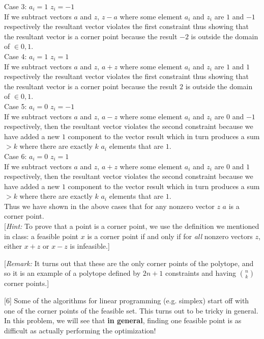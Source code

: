 \documentclass[addpoints, 11pt]{exam}
\begin{document}
\begin{questions}
  Case 3: $a_i = 1$ $z_i = -1$ \\
  If we subtract vectors $a$ and $z$, $z - a$ where some element $a_i$ and $z_i$ are $1$ and $-1$ respectively the resultant vector violates the first constraint
  thus showing that the resultant vector is a corner point because the result $-2$ is outside the domain of $\in 0, 1$. \\

  Case 4: $a_i = 1$ $z_i = 1$ \\
  If we subtract vectors $a$ and $z$, $a + z$ where some element $a_i$ and $z_i$ are $1$ and $1$ respectively the resultant vector violates the first constraint
  thus showing that the resultant vector is a corner point because the result $2$ is outside the domain of $\in 0, 1$. \\

  Case 5: $a_i = 0$ $z_i = -1$\\
  If we subtract vectors $a$ and $z$, $a - z$ where some element $a_i$ and $z_i$ are $0$ and $ -1$ respectively, then the resultant vector violates the second constraint because
  we have added a new $1$ component to the vector result which in turn produces a sum $> k$ where there are exactly $k$ $a_i$ elements that are $1$.\\

  Case 6: $a_i = 0$ $z_i = 1$ \\
  If we subtract vectors $a$ and $z$, $a + z$ where some element $a_i$ and $z_i$ are $0$ and $1$ respectively, then the resultant vector violates the second constraint because
  we have added a new $1$ component to the vector result which in turn produces a sum $ > k$ where there are exactly $k$ $a_i$ elements that are $1$.\\

  Thus we have shown in the above cases that for any nonzero vector $z$ $a$ is a corner point. \\

  [{\em Hint:} To prove that a point is a corner point, we use the definition we mentioned in class: a feasible point $x$ is a corner point if and only if for {\em all} nonzero vectors $z$, either $x + z$ or $x-z$ is infeasible.]

  [{\em Remark:} It turns out that these are the only corner points of the polytope, and so it is an example of a polytope defined by $2n+1$ constraints and having $\binom{n}{k}$ corner points.]

  [6]
  Some of the algorithms for linear programming (e.g. simplex) start off with one of the corner points of the feasible set.  This turns out to be tricky in general. In this problem, we will see that {\bf in general}, finding one feasible point is as difficult as actually performing the optimization!


\end{questions}
\end{document}
